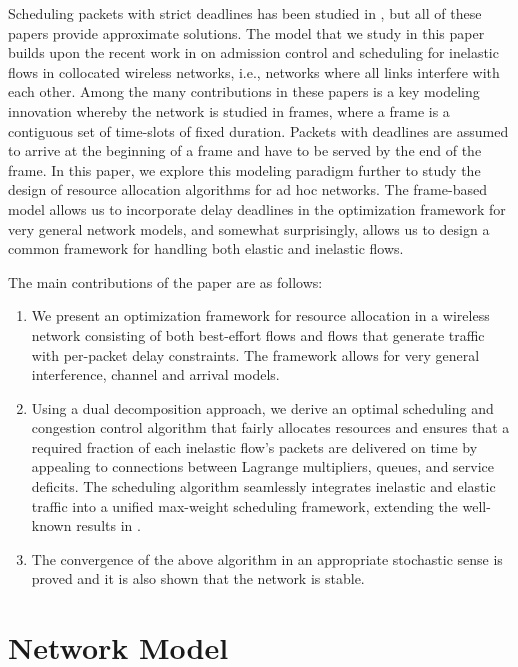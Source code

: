 \documentclass[conference]{IEEEtran}
\begin{document}
Scheduling packets with strict deadlines has been studied in \cite{Shakkottai02, Raghunathan08, Dua07, Liu06}, but all of these papers provide approximate solutions. The model that we study in this paper builds upon the recent work in \cite{Hou09a, Hou09b, Hou09c} on admission control and scheduling for inelastic flows in collocated wireless networks, i.e., networks where all links interfere with each other. Among the many contributions in these papers is a key modeling innovation whereby  the network is studied in frames, where a frame is a contiguous set of time-slots of fixed duration. Packets with deadlines are assumed to arrive at the beginning of a frame and have to be served by the end of the frame. In this paper, we explore this modeling paradigm further to study the design of resource allocation algorithms for ad hoc networks. The frame-based model allows us to incorporate delay deadlines in the optimization framework for very general network models, and somewhat surprisingly, allows us to design a common framework for handling both elastic and inelastic flows.

The main contributions of the paper are as follows:

\begin{enumerate}
	\item We present an optimization framework for resource allocation in a wireless network consisting of both best-effort flows and flows that generate traffic with per-packet delay constraints. The framework allows for very general interference, channel and arrival models.
	\item Using a dual decomposition approach, we derive an optimal scheduling and congestion control algorithm that fairly allocates resources and ensures that a required fraction of each inelastic flow's packets are delivered on time by appealing to connections between Lagrange multipliers, queues, and service deficits. The scheduling algorithm seamlessly integrates inelastic and elastic traffic into a unified max-weight scheduling framework, extending the well-known results in \cite{Tassiulas92}.
	\item The convergence of the above algorithm in an appropriate stochastic sense is proved and it is also shown that the network is stable.
\end{enumerate}

\section{Network Model}
\end{document}
